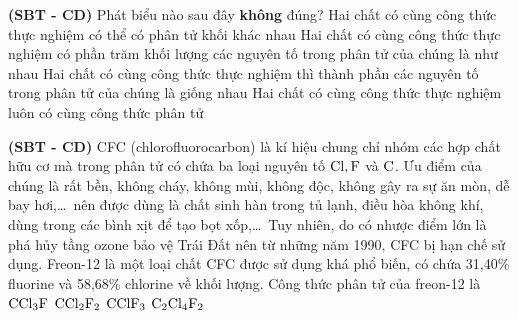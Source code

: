 \documentclass[12pt,a4paper]{article}
\begin{document}
\begin{ex}
\textbf{(SBT - CD)} Phát biểu nào sau đây \textbf{không} đúng?
\choice
{Hai chất có cùng công thức thực nghiệm có thể có phân tử khối khác nhau}
{Hai chất có cùng công thức thực nghiệm có phần trăm khối lượng các nguyên tố trong phân tử của chúng là như nhau}
{Hai chất có cùng công thức thực nghiệm thì thành phần các nguyên tố trong phân tử của chúng là giống nhau}
{\True Hai chất có cùng công thức thực nghiệm luôn có cùng công thức phân tử}

\end{ex}

\begin{ex}
\textbf{(SBT - CD)} CFC (chlorofluorocarbon) là kí hiệu chung chỉ nhóm các hợp chất hữu cơ mà trong phân tử có chứa ba loại nguyên tố $\ce{Cl, F}$ và $\ce{C}$. Ưu điểm của chúng là rất bền, không cháy, không mùi, không độc, không gây ra sự ăn mòn, dễ bay hơi,\dots\ nên được dùng là chất sinh hàn trong tủ lạnh, điều hòa không khí, dùng trong các bình xịt để tạo bọt xốp,\dots\ Tuy nhiên, do có nhược điểm lớn là phá hủy tầng ozone bảo vệ Trái Đất nên từ những năm 1990, CFC bị hạn chế sử dụng. Freon-12 là một loại chất CFC được sử dụng khá phổ biến, có chứa 31,40\% fluorine và 58,68\% chlorine về khối lượng. Công thức phân tử của freon-12 là
\choice
{$\ce{CCl3F}$}
{\True $\ce{CCl2F2}$}
{$\ce{CClF3}$}
{$\ce{C2Cl4F2}$}

\end{ex}
\end{document}

